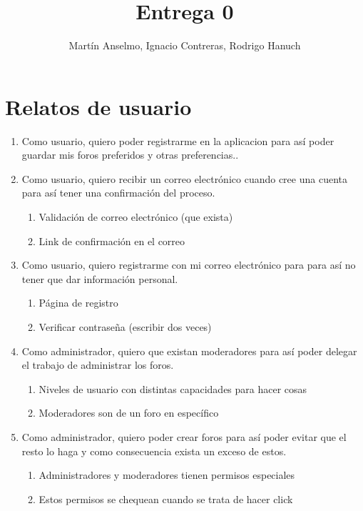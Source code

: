 \documentclass[12pt, letterpaper, notitlepage]{article}
\title{\textbf{Entrega 0}}
\author{Martín Anselmo, Ignacio Contreras, Rodrigo Hanuch}
\begin{document}
\clearpage\maketitle
\thispagestyle{empty}

\newpage

\section*{Relatos de usuario}
\newcommand{\story}[3]{Como {#1}, quiero {#2} para {#3}.}

\begin{enumerate}

	\item \story{usuario}{poder registrarme en la aplicacion}	
		{así poder guardar mis foros preferidos y otras preferencias.}
		

	\item \story{usuario}{recibir un correo electrónico cuando cree una cuenta}	
		{así tener una confirmación del proceso}
		\begin{enumerate}
			\item Validación de correo electrónico (que exista)
			\item Link de confirmación en el correo		
		\end{enumerate}
		
	\item \story{usuario}{registrarme con mi correo electrónico}{para así no tener que 
		dar información personal}
		\begin{enumerate}
			\item Página de registro
			\item Verificar contraseña (escribir dos veces)
		\end{enumerate}

	\item \story{administrador}{que existan moderadores}{así poder delegar el trabajo de administrar los foros}
		\begin{enumerate}
			\item Niveles de usuario con distintas capacidades para hacer cosas
			\item Moderadores son de un foro en específico
		\end{enumerate}
		
		\item \story{administrador}{poder crear foros}{así poder evitar que el resto lo haga y como consecuencia exista un exceso de estos}
		\begin{enumerate}
			\item Administradores y moderadores tienen permisos especiales
			\item Estos permisos se chequean cuando se trata de hacer click
		\end{enumerate}
		

\end{enumerate}
\end{document}
